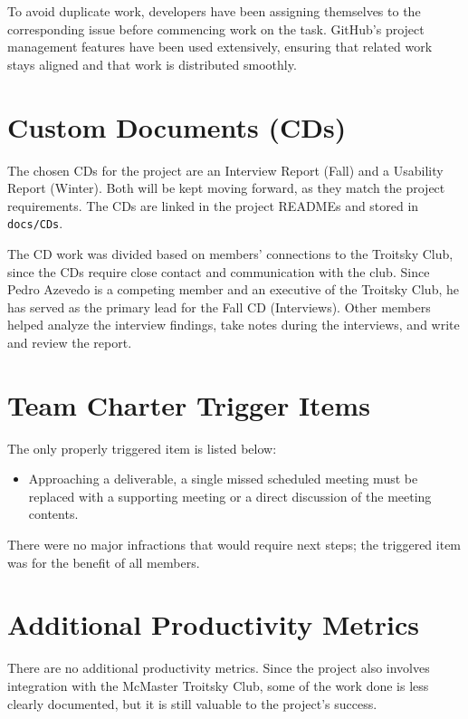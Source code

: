 \documentclass{article}
\begin{document}
To avoid duplicate work, developers have been assigning themselves to the corresponding issue before commencing work on the task. GitHub's project management
features have been used extensively, ensuring that related work stays aligned and that work is distributed smoothly.

\section{Custom Documents (CDs)}

The chosen CDs for the project are an Interview Report (Fall) and
a Usability Report (Winter). Both will be kept moving forward, as they match
the project requirements. The CDs are linked in the project READMEs and
stored in \texttt{docs/CDs}.

The CD work was divided based on members' connections to the Troitsky Club, since
the CDs require close contact and communication with the club. Since Pedro Azevedo is a competing
member and an executive of the Troitsky Club, he has served as the primary lead for
the Fall CD (Interviews). Other members helped analyze the interview findings,
take notes during the interviews, and write and review the report.

\section{Team Charter Trigger Items}

The only properly triggered item is listed below:
\begin{itemize}
\item Approaching a deliverable, a single missed scheduled meeting must be
  replaced with a supporting meeting or a direct discussion of the meeting
  contents.
\end{itemize}

There were no major infractions that would require next steps; the triggered item
was for the benefit of all members.

\section{Additional Productivity Metrics}

There are no additional productivity metrics. Since the project also involves integration with the McMaster Troitsky Club,
some of the work done is less clearly documented, but it is still valuable to the project's success.
\end{document}
